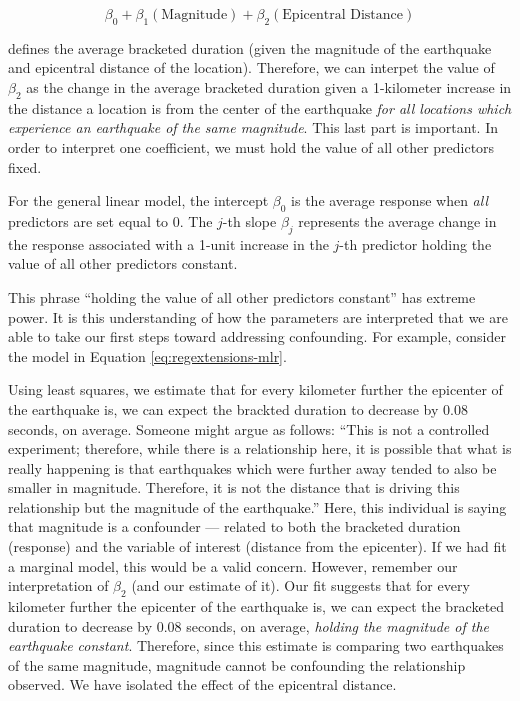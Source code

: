 \documentclass[
]{book}
\theoremstyle{plain}
\theoremstyle{mydefn}
\theoremstyle{myexmpl}
\theoremstyle{remark}
\begin{document}
\[\beta_0 + \beta_1(\text{Magnitude}) + \beta_2(\text{Epicentral Distance})\]

defines the average bracketed duration (given the magnitude of the earthquake and epicentral distance of the location). Therefore, we can interpet the value of \(\beta_2\) as the change in the average bracketed duration given a 1-kilometer increase in the distance a location is from the center of the earthquake \emph{for all locations which experience an earthquake of the same magnitude}. This last part is important. In order to interpret one coefficient, we must hold the value of all other predictors fixed.

\begin{rmdtip}
For the general linear model, the intercept \(\beta_0\) is the average response when \emph{all} predictors are set equal to 0. The \(j\)-th slope \(\beta_j\) represents the average change in the response associated with a 1-unit increase in the \(j\)-th predictor holding the value of all other predictors constant.
\end{rmdtip}

This phrase ``holding the value of all other predictors constant'' has extreme power. It is this understanding of how the parameters are interpreted that we are able to take our first steps toward addressing confounding. For example, consider the model in Equation \eqref{eq:regextensions-mlr}.

Using least squares, we estimate that for every kilometer further the epicenter of the earthquake is, we can expect the brackted duration to decrease by 0.08 seconds, on average. Someone might argue as follows: ``This is not a controlled experiment; therefore, while there is a relationship here, it is possible that what is really happening is that earthquakes which were further away tended to also be smaller in magnitude. Therefore, it is not the distance that is driving this relationship but the magnitude of the earthquake.'' Here, this individual is saying that magnitude is a confounder --- related to both the bracketed duration (response) and the variable of interest (distance from the epicenter). If we had fit a marginal model, this would be a valid concern. However, remember our interpretation of \(\beta_2\) (and our estimate of it). Our fit suggests that for every kilometer further the epicenter of the earthquake is, we can expect the bracketed duration to decrease by 0.08 seconds, on average, \emph{holding the magnitude of the earthquake constant}. Therefore, since this estimate is comparing two earthquakes of the same magnitude, magnitude cannot be confounding the relationship observed. We have isolated the effect of the epicentral distance.
\end{document}
